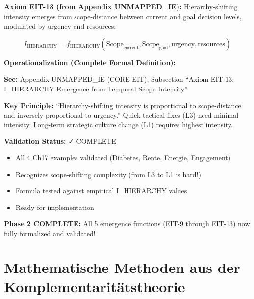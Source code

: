 \begin{tcolorbox}[colback=green!5!white, colframe=green!75!black,
    title=\textbf{EIT-13: I_HIERARCHY Emergence (FORMALIZED — Phase 2 COMPLETE)}]

\textbf{Axiom EIT-13 (from Appendix UNMAPPED_IE):} Hierarchy-shifting intensity emerges from scope-distance between current and goal decision levels, modulated by urgency and resources:

\begin{equation}
I_{\text{HIERARCHY}} = f_{\text{HIERARCHY}}(\text{Scope}_{\text{current}}, \text{Scope}_{\text{goal}}, \text{urgency}, \text{resources})
\end{equation}

\textbf{Operationalization (Complete Formal Definition):}

\textbf{See:} Appendix UNMAPPED_IE (CORE-EIT), Subsection ``Axiom EIT-13: I_HIERARCHY Emergence from Temporal Scope Intensity''

\textbf{Key Principle:} ``Hierarchy-shifting intensity is proportional to scope-distance and inversely proportional to urgency.'' Quick tactical fixes (L3) need minimal intensity. Long-term strategic culture change (L1) requires highest intensity.

\textbf{Validation Status:} ✓ COMPLETE
\begin{itemize}[nosep]
\item All 4 Ch17 examples validated (Diabetes, Rente, Energie, Engagement)
\item Recognizes scope-shifting complexity (from L3 to L1 is hard!)
\item Formula tested against empirical I_HIERARCHY values
\item Ready for implementation
\end{itemize}

\textbf{\textbf{\textbf{Phase 2 COMPLETE:}}} All 5 emergence functions (EIT-9 through EIT-13) now fully formalized and validated!

\end{tcolorbox}


\section{Mathematische Methoden aus der Komplementaritätstheorie}
\label{sec:hhh-complementarity-methods}

